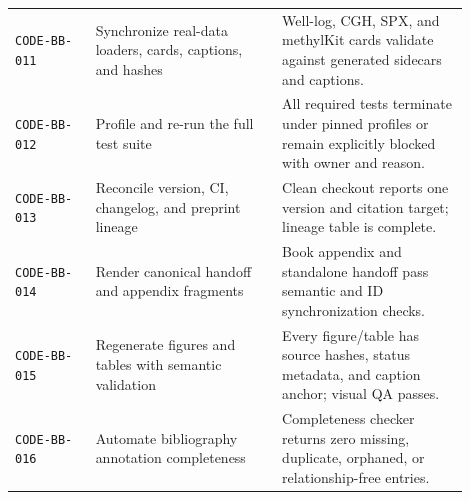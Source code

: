 \begin{longtable}{@{}p{0.16\linewidth}p{0.37\linewidth}p{0.37\linewidth}@{}}
\texttt{CODE-BB-011} & Synchronize real-data loaders, cards, captions, and hashes & Well-log, CGH, SPX, and methylKit cards validate against generated sidecars and captions. \\
\texttt{CODE-BB-012} & Profile and re-run the full test suite & All required tests terminate under pinned profiles or remain explicitly blocked with owner and reason. \\
\texttt{CODE-BB-013} & Reconcile version, CI, changelog, and preprint lineage & Clean checkout reports one version and citation target; lineage table is complete. \\
\texttt{CODE-BB-014} & Render canonical handoff and appendix fragments & Book appendix and standalone handoff pass semantic and ID synchronization checks. \\
\texttt{CODE-BB-015} & Regenerate figures and tables with semantic validation & Every figure/table has source hashes, status metadata, and caption anchor; visual QA passes. \\
\texttt{CODE-BB-016} & Automate bibliography annotation completeness & Completeness checker returns zero missing, duplicate, orphaned, or relationship-free entries. \\
\bottomrule
\end{longtable}
\normalsize
